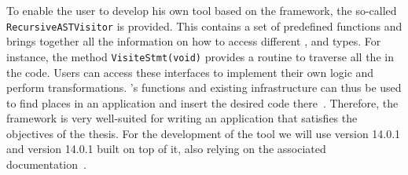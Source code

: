 To enable the user to develop his own tool based on the \CLANG framework, the so-called \lstinline{RecursiveASTVisitor} is provided. This contains a set of predefined functions and brings together all the information on how to access different \declssmall, \STATS and types. For instance, the method \lstinline{VisiteStmt(void)} provides a routine to traverse all the \STATS in the code. Users can access these interfaces to implement their own logic and perform \SOUTOSOU transformations. \CLANG's functions and existing infrastructure can thus be used to find places in an application and insert the desired code there~\cite{ClangLibTooling}. Therefore, the framework is very well-suited for writing an application that satisfies the objectives of the thesis. For the development of the tool we will use \LLVM version 14.0.1 and \CLANG version 14.0.1 built on top of it, also relying on the associated documentation~\cite{ClangDocs}. 